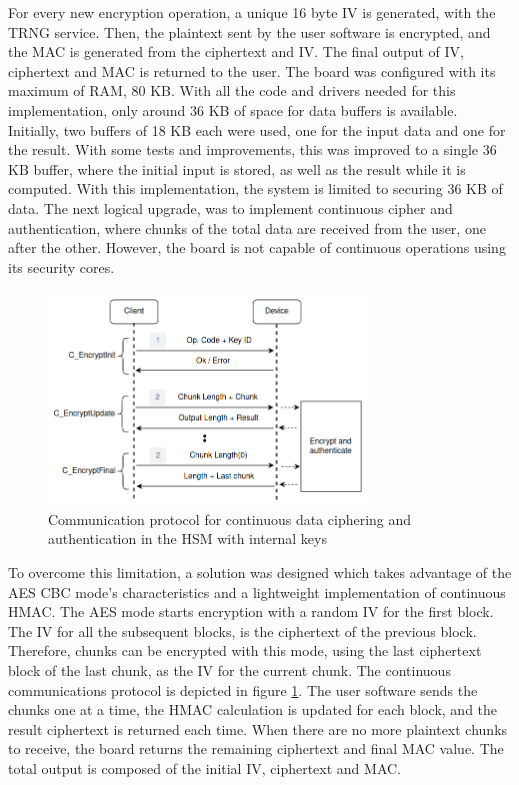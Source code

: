 For every new encryption operation, a unique 16 byte IV is generated, with the TRNG service.
Then, the plaintext sent by the user software is encrypted, and the MAC is generated from the ciphertext and IV. The final output of IV, ciphertext and MAC is returned to the user.
The board was configured with its maximum of RAM, 80 KB. With all the code and drivers needed for this implementation, only around 36 KB of space for data buffers is available. Initially, two buffers of 18 KB each were used, one for the input data and one for the result. With some tests and improvements, this was improved to a single 36 KB buffer, where the initial input is stored, as well as the result while it is computed. With this implementation, the system is limited to securing 36 KB of data. The next logical upgrade, was to implement continuous cipher and authentication, where chunks of the total data are received from the user, one after the other. However, the board is not capable of continuous operations using its security cores.
\begin{figure}[h!]
	\centering
	\includegraphics[width=0.75\textwidth]{./Images/data-exchange-chunks.png}
	\caption{Communication protocol for continuous data ciphering and authentication in the HSM with internal keys}
	\label{fig:protocol:data-exchange-chunks}
\end{figure}
To overcome this limitation, a solution was designed which takes advantage of the AES CBC mode's characteristics and a lightweight implementation of continuous HMAC. The AES mode starts encryption with a random IV for the first block. The IV for all the subsequent blocks, is the ciphertext of the previous block. Therefore, chunks can be encrypted with this mode, using the last ciphertext block of the last chunk, as the IV for the current chunk. The continuous communications protocol is depicted in figure \ref{fig:protocol:data-exchange-chunks}. The user software sends the chunks one at a time, the HMAC calculation is updated for each block, and the result ciphertext is returned each time. When there are no more plaintext chunks to receive, the board returns the remaining ciphertext and final MAC value. The total output is composed of the initial IV, ciphertext and MAC.
